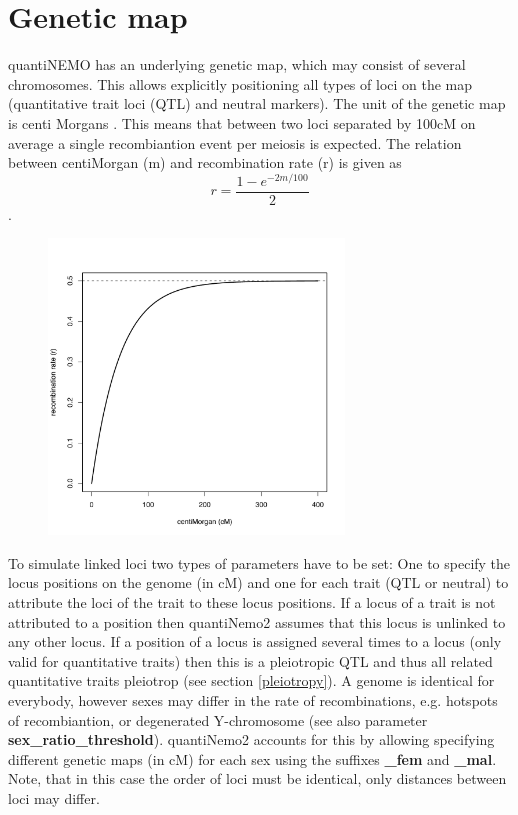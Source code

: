 \documentclass[letterpaper,12pt,oneside]{book}
\begin{document}
\chapter{Genetic map}\label{chap:geneticMap}
quantiNEMO has an underlying genetic map, which may consist of several chromosomes. This allows
explicitly positioning all types of loci on the map (quantitative trait loci (QTL) and neutral
markers). The unit of the genetic map is centi Morgans \citep[cM]{Haldane_1919}. This means that
between two loci separated by 100cM on average a single recombiantion event per meiosis is expected.
The relation between centiMorgan (m) and recombination rate (r) is given as 
\[r=\frac{1-e^{-2m/100}}{2}\].

\begin{figure}[h]
	\centering
		\includegraphics[width=0.70\textwidth]{cM2r.pdf}
	\label{fig:centiMorgan to recombination rate}
\end{figure}



To simulate linked loci two types of parameters have to be set: One to
specify the locus positions on the genome (in cM) and one for each trait (QTL or neutral) to
attribute the loci of the trait to these locus positions. If a locus of a trait is not attributed
to a position then quantiNemo2 assumes that this locus is unlinked to any other locus. If a position of a locus is assigned several times to a locus (only valid for quantitative traits) then this is a pleiotropic QTL and thus all related quantitative traits pleiotrop (see section \ref{pleiotropy}). A genome is
identical for everybody, however sexes may differ in the rate of recombinations, e.g. hotspots of
recombiantion, or degenerated Y-chromosome (see also parameter
\textbf{sex\_ratio\_threshold}). quantiNemo2 accounts for this by allowing specifying
different genetic maps (in cM) for each sex using the suffixes \textbf{\_fem} and \textbf{\_mal}.
Note, that in this case the order of loci must be identical, only distances between loci
may differ.
\end{document}
